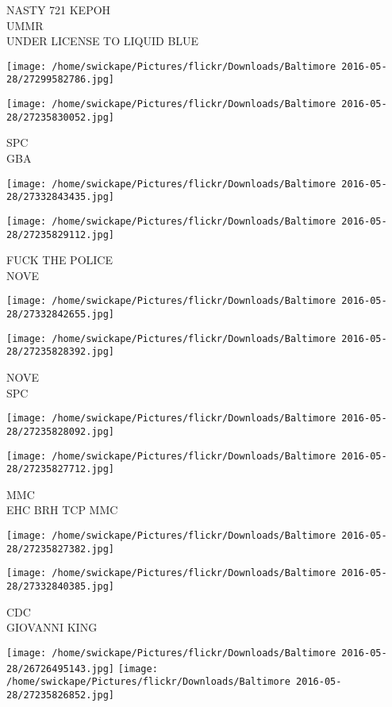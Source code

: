 \documentclass[10pt,letterpaper]{article}
\begin{document}
NASTY 721 KEPOH\\
UMMR\\
UNDER LICENSE TO LIQUID BLUE
\pagebreak

\texttt{[image: /home/swickape/Pictures/flickr/Downloads/Baltimore 2016-05-28/27299582786.jpg]}

\vspace{0.25in}
\texttt{[image: /home/swickape/Pictures/flickr/Downloads/Baltimore 2016-05-28/27235830052.jpg]}

SPC\\
GBA
\pagebreak

\texttt{[image: /home/swickape/Pictures/flickr/Downloads/Baltimore 2016-05-28/27332843435.jpg]}

\vspace{0.25in}
\texttt{[image: /home/swickape/Pictures/flickr/Downloads/Baltimore 2016-05-28/27235829112.jpg]}

FUCK THE POLICE\\
NOVE
\pagebreak

\texttt{[image: /home/swickape/Pictures/flickr/Downloads/Baltimore 2016-05-28/27332842655.jpg]}

\vspace{0.25in}
\texttt{[image: /home/swickape/Pictures/flickr/Downloads/Baltimore 2016-05-28/27235828392.jpg]}

NOVE\\
SPC
\pagebreak

\texttt{[image: /home/swickape/Pictures/flickr/Downloads/Baltimore 2016-05-28/27235828092.jpg]}

\vspace{0.25in}
\texttt{[image: /home/swickape/Pictures/flickr/Downloads/Baltimore 2016-05-28/27235827712.jpg]}

MMC\\
EHC BRH TCP MMC
\pagebreak

\texttt{[image: /home/swickape/Pictures/flickr/Downloads/Baltimore 2016-05-28/27235827382.jpg]}

\vspace{0.25in}
\texttt{[image: /home/swickape/Pictures/flickr/Downloads/Baltimore 2016-05-28/27332840385.jpg]}

CDC\\
GIOVANNI KING
\pagebreak

\texttt{[image: /home/swickape/Pictures/flickr/Downloads/Baltimore 2016-05-28/26726495143.jpg]}
\texttt{[image: /home/swickape/Pictures/flickr/Downloads/Baltimore 2016-05-28/27235826852.jpg]}
\end{document}

